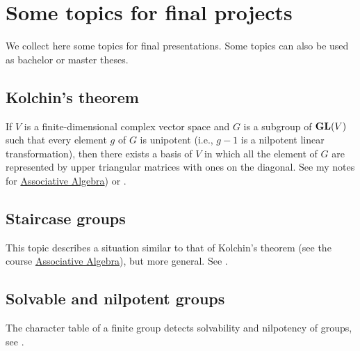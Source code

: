 \section*{Some topics for final projects}

\pagestyle{plain}
\fancyhf{}
\fancyfoot[CE,CO]{\leftmark}
\fancyfoot[LE,RO]{\thepage}

We collect here some topics for final presentations. Some topics
can also be used as bachelor or master theses. 

\subsection*{Kolchin's theorem}

If $V$ is a finite-dimensional complex 
vector space and $G$ is a subgroup of $\mathbf{GL}(V)$ such that every element $g$ of $G$ is unipotent (i.e., $g - 1$ is a nilpotent linear transformation), then there exists a basis of $V$ in which 
all the element of $G$ are represented by upper triangular matrices with ones on the diagonal. See my
notes for \href{https://github.com/vendramin/associative/}{Associative Algebra}) or \cite[Chapter 2]{MR1369573}.

\subsection*{Staircase groups}

This topic describes a situation similar to that of Kolchin's theorem (see the course \href{https://github.com/vendramin/associative/}{Associative Algebra}), but
more general. See \cite[Chapter 5]{MR1369573}.

\subsection*{Solvable and nilpotent groups}

The character table of a finite group
detects solvability and nilpotency of groups, see
\cite[Chapter 6]{MR1369573}.




